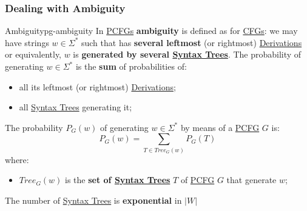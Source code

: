 \subsubsection{Dealing with Ambiguity}\label{sub:lm_pg_dealing_with_ambiguity} %
\begin{definition}{Ambiguity}{pg-ambiguity}
    In \hyperref[def:pcfg]{PCFGs} \textbf{ambiguity} is defined as for \hyperref[def:ambiguita]{CFGs}: we may have strings $w\in\Sigma^*$ such that has \textbf{several leftmost} (or rightmost) \hyperref[def:pg-derivation]{Derivations} or equivalently, $w$ is \textbf{generated by several {\hyperref[def:pg-syntax-tree]{Syntax Trees}}}.
    The probability of generating $w\in\Sigma^*$ is the \textbf{sum} of probabilities of:
    \begin{itemize}
        \item all its leftmost (or rightmost) \hyperref[def:pg-derivation]{Derivations};
        \item all {\hyperref[def:pg-syntax-tree]{Syntax Trees}} generating it;
    \end{itemize}
\end{definition}
The probability $P_G(w)$ of generating $w \in \Sigma^*$ by means of a \hyperref[def:pcfg]{PCFG} $G$ is:
\[
    P_G(w) = \sum_{T\in Tree_G(w)}{P_G(T)}
\]
where:
\begin{itemize}
    \item $Tree_G(w)$ is the \textbf{set of {\hyperref[def:pg-syntax-tree]{Syntax Trees}}} $T$ of \hyperref[def:pcfg]{PCFG} $G$ that generate $w$;
\end{itemize}
\begin{note}
    The number of \hyperref[def:pg-syntax-tree]{Syntax Trees} is \textbf{exponential} in $|W|$
\end{note}
